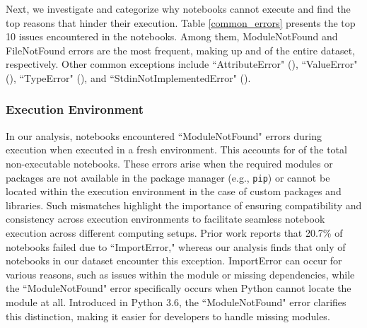      
     Next, we investigate and categorize why \percentNonExecutable notebooks cannot execute and find the top reasons that hinder their execution. Table \ref{common_errors} presents the top 10 issues encountered in the notebooks. Among them, ModuleNotFound and FileNotFound errors are the most frequent, making up \percentModuleNotFoundInTotal and \percentFileNotFoundInTotal of the entire dataset, respectively. Other common exceptions include ``AttributeError" (\percentAttributeErrorInTotal), ``ValueError" (\percentValueErrorInTotal), ``TypeError" (\percentTypeErrorInTotal), and ``StdinNotImplementedError" (\percentUserInputsInTotal).
    
    

    \subsubsection{Execution Environment}
        In our analysis, \totalModuleNotFound notebooks encountered ``ModuleNotFound" errors during execution when executed in a fresh environment. This accounts for \percentModuleNotFoundInNonExecutable of the total non-executable notebooks. These errors arise when the required modules or packages are not available in the package manager (e.g., {\small{\texttt {pip}}}) or cannot be located within the execution environment in the case of custom packages and libraries. Such mismatches highlight the importance of ensuring compatibility and consistency across execution environments to facilitate seamless notebook execution across different computing setups. Prior work \cite{Pimentel2019} reports that 20.7\% of notebooks failed due to ``ImportError," whereas our analysis finds that only \percentIndexErrorInTotal of notebooks in our dataset encounter this exception. ImportError can occur for various reasons, such as issues within the module or missing dependencies, while the ``ModuleNotFound" error specifically occurs when Python cannot locate the module at all. Introduced in Python 3.6, the ``ModuleNotFound" error clarifies this distinction, making it easier for developers to handle missing modules.


